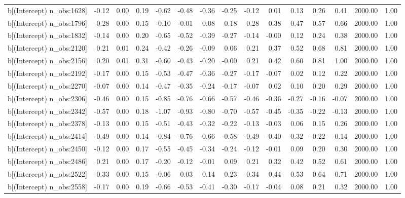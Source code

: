 \begin{table}[ht]
\begin{tabular}{rrrrrrrrrrrrrrr}
  b[(Intercept) n\_obs:1628] & -0.12 & 0.00 & 0.19 & -0.62 & -0.48 & -0.36 & -0.25 & -0.12 & 0.01 & 0.13 & 0.26 & 0.41 & 2000.00 & 1.00 \\ 
  b[(Intercept) n\_obs:1796] & 0.28 & 0.00 & 0.15 & -0.10 & -0.01 & 0.08 & 0.18 & 0.28 & 0.38 & 0.47 & 0.57 & 0.66 & 2000.00 & 1.00 \\ 
  b[(Intercept) n\_obs:1832] & -0.14 & 0.00 & 0.20 & -0.65 & -0.52 & -0.39 & -0.27 & -0.14 & -0.00 & 0.12 & 0.24 & 0.38 & 2000.00 & 1.00 \\ 
  b[(Intercept) n\_obs:2120] & 0.21 & 0.01 & 0.24 & -0.42 & -0.26 & -0.09 & 0.06 & 0.21 & 0.37 & 0.52 & 0.68 & 0.81 & 2000.00 & 1.00 \\ 
  b[(Intercept) n\_obs:2156] & 0.20 & 0.01 & 0.31 & -0.60 & -0.43 & -0.20 & -0.00 & 0.21 & 0.42 & 0.60 & 0.81 & 1.00 & 2000.00 & 1.00 \\ 
  b[(Intercept) n\_obs:2192] & -0.17 & 0.00 & 0.15 & -0.53 & -0.47 & -0.36 & -0.27 & -0.17 & -0.07 & 0.02 & 0.12 & 0.22 & 2000.00 & 1.00 \\ 
  b[(Intercept) n\_obs:2270] & -0.07 & 0.00 & 0.14 & -0.47 & -0.35 & -0.24 & -0.17 & -0.07 & 0.02 & 0.10 & 0.20 & 0.29 & 2000.00 & 1.00 \\ 
  b[(Intercept) n\_obs:2306] & -0.46 & 0.00 & 0.15 & -0.85 & -0.76 & -0.66 & -0.57 & -0.46 & -0.36 & -0.27 & -0.16 & -0.07 & 2000.00 & 1.00 \\ 
  b[(Intercept) n\_obs:2342] & -0.57 & 0.00 & 0.18 & -1.07 & -0.93 & -0.80 & -0.70 & -0.57 & -0.45 & -0.35 & -0.22 & -0.13 & 2000.00 & 1.00 \\ 
  b[(Intercept) n\_obs:2378] & -0.13 & 0.00 & 0.15 & -0.51 & -0.43 & -0.32 & -0.22 & -0.13 & -0.03 & 0.06 & 0.15 & 0.26 & 2000.00 & 1.00 \\ 
  b[(Intercept) n\_obs:2414] & -0.49 & 0.00 & 0.14 & -0.84 & -0.76 & -0.66 & -0.58 & -0.49 & -0.40 & -0.32 & -0.22 & -0.14 & 2000.00 & 1.00 \\ 
  b[(Intercept) n\_obs:2450] & -0.12 & 0.00 & 0.17 & -0.55 & -0.45 & -0.34 & -0.24 & -0.12 & -0.01 & 0.09 & 0.20 & 0.30 & 2000.00 & 1.00 \\ 
  b[(Intercept) n\_obs:2486] & 0.21 & 0.00 & 0.17 & -0.20 & -0.12 & -0.01 & 0.09 & 0.21 & 0.32 & 0.42 & 0.52 & 0.61 & 2000.00 & 1.00 \\ 
  b[(Intercept) n\_obs:2522] & 0.33 & 0.00 & 0.15 & -0.06 & 0.03 & 0.14 & 0.23 & 0.34 & 0.44 & 0.53 & 0.64 & 0.71 & 2000.00 & 1.00 \\ 
  b[(Intercept) n\_obs:2558] & -0.17 & 0.00 & 0.19 & -0.66 & -0.53 & -0.41 & -0.30 & -0.17 & -0.04 & 0.08 & 0.21 & 0.32 & 2000.00 & 1.00 \\ 

\end{tabular}
\end{table}

